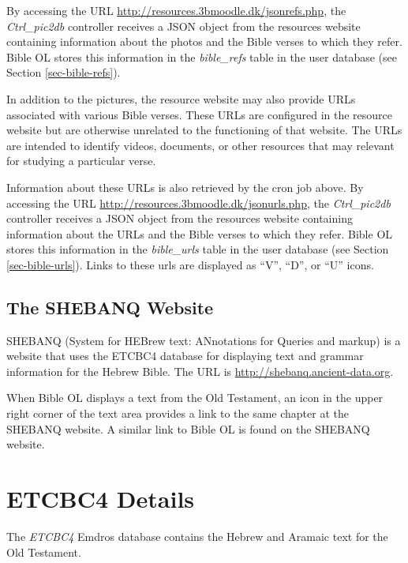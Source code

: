\documentclass[11pt,oneside,a4paper]{memoir}
\begin{document}
By accessing the URL \url{http://resources.3bmoodle.dk/jsonrefs.php}, the \emph{Ctrl\_pic2db}
controller receives a JSON object from the resources website containing information about the photos
and the Bible verses to which they refer. Bible OL stores this information in the \emph{bible\_refs}
table in the user database (see Section \ref{sec-bible-refs}).

In addition to the pictures, the resource website may also provide URLs associated with various
Bible verses. These URLs are configured in the resource website but are otherwise unrelated to the
functioning of that website. The URLs are intended to identify videos, documents, or other resources
that may relevant for studying a particular verse.

Information about these URLs is also retrieved by the cron job above. By accessing the URL
\url{http://resources.3bmoodle.dk/jsonurls.php}, the \emph{Ctrl\_pic2db} controller receives a JSON
object from the resources website containing information about the URLs and the Bible verses to
which they refer. Bible OL stores this information in the \emph{bible\_urls} table in the user
database (see Section \ref{sec-bible-urls}). Links to these urls are displayed as ``V'', ``D'', or
``U'' icons.

\section{The SHEBANQ Website}

SHEBANQ (System for HEBrew text: ANnotations for Queries and markup) is a website that uses the
ETCBC4 database for displaying text and grammar information for the Hebrew Bible. The URL is
\url{http://shebanq.ancient-data.org}.

 When Bible OL
displays a text from the Old Testament, an icon in the upper right corner of the text area provides
a link to the same chapter at the SHEBANQ website. A similar link to Bible OL is found on the
SHEBANQ website.


\appendix
\chapter{ETCBC4 Details}\label{app-etcbc}

The \emph{ETCBC4} Emdros database contains the Hebrew and Aramaic text for the Old Testament.
\end{document}

